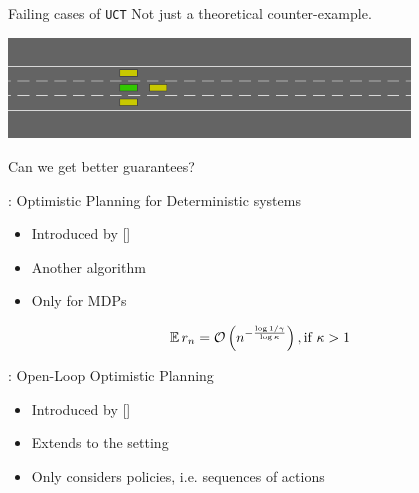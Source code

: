 \documentclass{beamer}
\begin{document}
\begin{frame}{Failing cases of \texttt{UCT}}
    Not just a theoretical counter-example.
    \begin{center}
    \includegraphics[width=0.8\textwidth]{img/uct_trap}\\
    \bigskip
    
    \end{center}
\end{frame}

\begin{frame}{Can we get better guarantees?}
    \begin{block}{\OPD: Optimistic Planning for Deterministic systems}
    \begin{itemize}
        \item Introduced by [\cite{Hren2008}]
        \item Another  algorithm
        \item Only for  MDPs
    \end{itemize}
    \end{block}
    \begin{theorem}
    \begin{equation*}
    \expectedvalue r_n = 
      \cO\left(n^{-\frac{\log 1/\gamma}{\log \kappa}}\right), \text{if}\ \kappa > 1 
    \end{equation*}
    \end{theorem}
\begin{block}{\OLOP: Open-Loop Optimistic Planning}
    \begin{itemize}
        \item Introduced by [\cite{Bubeck2010}]
        \item Extends \OPD to the  setting
        \item Only considers  policies, i.e. sequences of actions
    \end{itemize}
    \end{block}
\end{frame}
\end{document}
